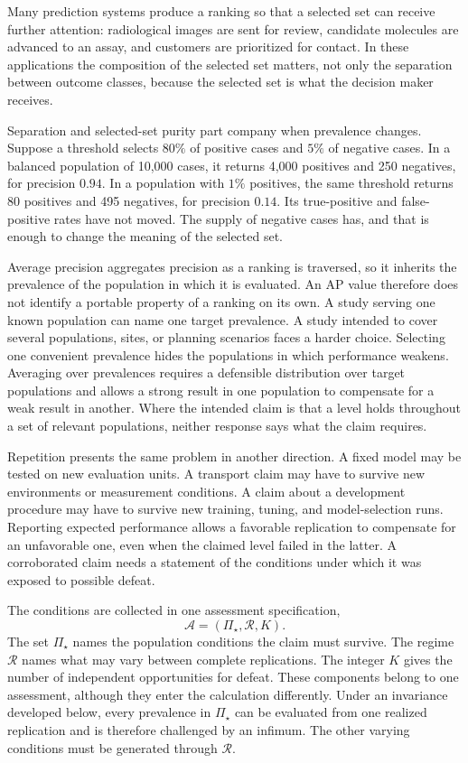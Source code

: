\documentclass[11pt]{article}
\newcommand{\Regime}{\mathcal{R}}
\newcommand{\Assess}{\mathcal{A}}
\newcommand{\PSet}{\Pi_\star}
\theoremstyle{remark}
\begin{document}
Many prediction systems produce a ranking so that a selected set can receive further attention: radiological images are sent for review, candidate molecules are advanced to an assay, and customers are prioritized for contact. In these applications the composition of the selected set matters, not only the separation between outcome classes, because the selected set is what the decision maker receives.

Separation and selected-set purity part company when prevalence changes. Suppose a threshold selects $80\%$ of positive cases and $5\%$ of negative cases. In a balanced population of 10,000 cases, it returns 4,000 positives and 250 negatives, for precision $0.94$. In a population with $1\%$ positives, the same threshold returns 80 positives and 495 negatives, for precision $0.14$. Its true-positive and false-positive rates have not moved. The supply of negative cases has, and that is enough to change the meaning of the selected set.

Average precision aggregates precision as a ranking is traversed, so it inherits the prevalence of the population in which it is evaluated. An AP value therefore does not identify a portable property of a ranking on its own. A study serving one known population can name one target prevalence. A study intended to cover several populations, sites, or planning scenarios faces a harder choice. Selecting one convenient prevalence hides the populations in which performance weakens. Averaging over prevalences requires a defensible distribution over target populations and allows a strong result in one population to compensate for a weak result in another. Where the intended claim is that a level holds throughout a set of relevant populations, neither response says what the claim requires.

Repetition presents the same problem in another direction. A fixed model may be tested on new evaluation units. A transport claim may have to survive new environments or measurement conditions. A claim about a development procedure may have to survive new training, tuning, and model-selection runs. Reporting expected performance allows a favorable replication to compensate for an unfavorable one, even when the claimed level failed in the latter. A corroborated claim needs a statement of the conditions under which it was exposed to possible defeat.

The conditions are collected in one assessment specification,
\[
\Assess=(\PSet,\Regime,K).
\]
The set $\PSet$ names the population conditions the claim must survive. The regime $\Regime$ names what may vary between complete replications. The integer $K$ gives the number of independent opportunities for defeat. These components belong to one assessment, although they enter the calculation differently. Under an invariance developed below, every prevalence in $\PSet$ can be evaluated from one realized replication and is therefore challenged by an infimum. The other varying conditions must be generated through $\Regime$.
\end{document}
